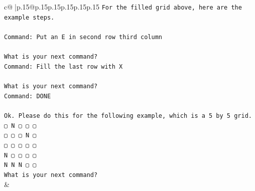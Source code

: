 \documentclass{article}
\begin{document}
{\begin{supertabular}{c@{$\;$}|p{.15\linewidth}@{}p{.15\linewidth}p{.15\linewidth}p{.15\linewidth}p{.15\linewidth}p{.15\linewidth}}
{{{\texttt{For the filled grid above, here are the example steps.} \\
\\ 
\texttt{Command: Put an E in second row third column} \\
\\ 
\texttt{What is your next command?} \\
\texttt{Command: Fill the last row with X} \\
\\ 
\texttt{What is your next command?} \\
\texttt{Command: DONE} \\
\\ 
\texttt{Ok. Please do this for the following example, which is a 5 by 5 grid.} \\
\texttt{▢ N ▢ ▢ ▢} \\
\texttt{▢ ▢ ▢ N ▢} \\
\texttt{▢ ▢ ▢ ▢ ▢} \\
\texttt{N ▢ ▢ ▢ ▢} \\
\texttt{N N N ▢ ▢} \\
\texttt{What is your next command?} \\
            }
        }
    }
    & \\ \\


\end{supertabular}}
\end{document}
